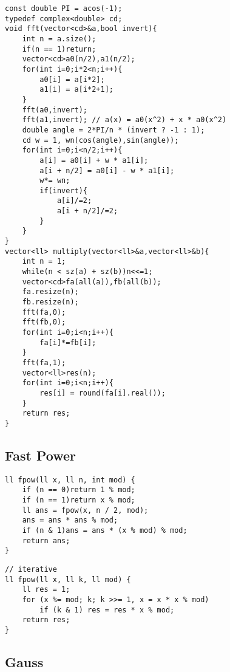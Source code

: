 \begin{lstlisting}[style=cpp]
const double PI = acos(-1);
typedef complex<double> cd;
void fft(vector<cd>&a,bool invert){
    int n = a.size();
    if(n == 1)return;
    vector<cd>a0(n/2),a1(n/2);
    for(int i=0;i*2<n;i++){
        a0[i] = a[i*2];
        a1[i] = a[i*2+1];
    }
    fft(a0,invert);
    fft(a1,invert); // a(x) = a0(x^2) + x * a0(x^2)
    double angle = 2*PI/n * (invert ? -1 : 1);
    cd w = 1, wn(cos(angle),sin(angle));
    for(int i=0;i<n/2;i++){
        a[i] = a0[i] + w * a1[i];
        a[i + n/2] = a0[i] - w * a1[i];
        w*= wn;
        if(invert){
            a[i]/=2;
            a[i + n/2]/=2;
        }
    }
}
vector<ll> multiply(vector<ll>&a,vector<ll>&b){
    int n = 1;
    while(n < sz(a) + sz(b))n<<=1;
    vector<cd>fa(all(a)),fb(all(b));
    fa.resize(n);
    fb.resize(n);
    fft(fa,0);
    fft(fb,0);
    for(int i=0;i<n;i++){
        fa[i]*=fb[i];
    }
    fft(fa,1);
    vector<ll>res(n);
    for(int i=0;i<n;i++){
        res[i] = round(fa[i].real());
    }
    return res;
}
\end{lstlisting}

\subsection{Fast Power}

\begin{lstlisting}[style=cpp]
ll fpow(ll x, ll n, int mod) {  
    if (n == 0)return 1 % mod;  
    if (n == 1)return x % mod;  
    ll ans = fpow(x, n / 2, mod);  
    ans = ans * ans % mod;  
    if (n & 1)ans = ans * (x % mod) % mod;  
    return ans;  
}
\end{lstlisting}

\begin{lstlisting}[style=cpp]
 // iterative
ll fpow(ll x, ll k, ll mod) {
	ll res = 1;
	for (x %= mod; k; k >>= 1, x = x * x % mod)
		if (k & 1) res = res * x % mod;
	return res;
}
\end{lstlisting}

\subsection{Gauss}

